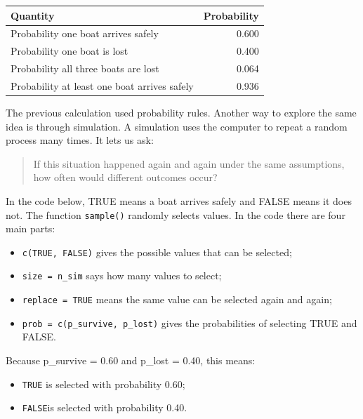 \documentclass[
  letterpaper,
  DIV=11,
  numbers=noendperiod]{scrreprt}
\providecommand{\tightlist}{%
  \setlength{\itemsep}{0pt}\setlength{\parskip}{0pt}}
\begin{document}
\begin{table}
\fontsize{12.0pt}{14.0pt}\selectfont
\begin{tabular*}{\linewidth}{@{\extracolsep{\fill}}lr}
\toprule
Quantity & Probability \\ 
\midrule\addlinespace[2.5pt]
Probability one boat arrives safely & 0.600 \\ 
Probability one boat is lost & 0.400 \\ 
Probability all three boats are lost & 0.064 \\ 
Probability at least one boat arrives safely & 0.936 \\ 
\bottomrule
\end{tabular*}
\end{table}

The previous calculation used probability rules. Another way to explore
the same idea is through simulation. A simulation uses the computer to
repeat a random process many times. It lets us ask:

\begin{quote}
If this situation happened again and again under the same assumptions,
how often would different outcomes occur?
\end{quote}

In the code below, TRUE means a boat arrives safely and FALSE means it
does not. The function \texttt{sample()} randomly selects values. In the
code there are four main parts:

\begin{itemize}
\tightlist
\item
  \texttt{c(TRUE,\ FALSE)} gives the possible values that can be
  selected;
\item
  \texttt{size\ =\ n\_sim} says how many values to select;
\item
  \texttt{replace\ =\ TRUE} means the same value can be selected again
  and again;
\item
  \texttt{prob\ =\ c(p\_survive,\ p\_lost)} gives the probabilities of
  selecting TRUE and FALSE.
\end{itemize}

Because p\_survive = 0.60 and p\_lost = 0.40, this means:

\begin{itemize}
\tightlist
\item
  \texttt{TRUE} is selected with probability 0.60;
\item
  \texttt{FALSE}is selected with probability 0.40.
\end{itemize}
\end{document}
